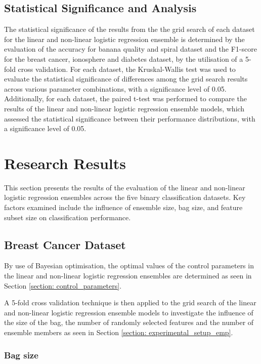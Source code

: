 \documentclass[10pt, conference]{IEEEtran}
\begin{document}
\subsection{Statistical Significance and Analysis}

The statistical significance of the results from the the grid search of each dataset for the linear and
non-linear logistic regression ensemble is determined by the evaluation of the accuracy for banana quality and spiral
dataset and the F1-score for the breast cancer, ionosphere and diabetes dataset, by the utilisation of a 5-fold cross validation. 
For each dataset, the Kruskal-Wallis test was used to evaluate the statistical significance of differences among the grid search
results across various parameter combinations, with a significance level of 0.05. Additionally, for each dataset, the
paired t-test was performed to compare the results of the linear and non-linear logistic regression ensemble models,
which assessed the statistical significance between their performance distributions, with a significance level of 0.05.

\section{Research Results} \label{section: Research Results}

This section presents the results of the evaluation of the linear and non-linear logistic regression ensembles across the five
binary classification datasets. Key factors examined include the influence of ensemble size, bag size, and feature subset
size on classification performance.

\subsection{Breast Cancer Dataset}

By use of Bayesian optimisation, the optimal values of the control parameters in the
linear and non-linear logistic regression ensembles are determined as seen in
Section \ref{section: control_parameters}.

A 5-fold cross validation technique is then applied to the grid search of the linear and non-linear logistic regression ensemble models
to investigate the influence of the size of the bag, the number of randomly selected features and
the number of ensemble members as seen in Section \ref{section: experimental_setup_emp}.

\subsubsection{Bag size}
\end{document}

